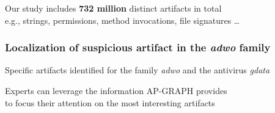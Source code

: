 \begin{frame}
    \smallskip{}

    \normalsize{Our study includes \textbf{732 million} distinct artifacts in total} \\
    \smallskip{}
    \small{e.g., strings, permissions, method invocations, file signatures \ldots}


\end{frame}

\begin{frame}
    \frametitle{Localization of suspicious artifact in the \textit{adwo} family}
    \centering
    \vspace{-20pt}

    \begin{table}[t]
        \resizebox{\textwidth}{!}{
            
        }
        \caption{\footnotesize{Specific artifacts identified for the family \textit{adwo} and the antivirus \textit{gdata}}}
    \end{table}

    \vspace{-10pt}

    Experts can leverage the information AP-GRAPH provides \\
    to focus their attention on the most interesting artifacts

\end{frame}

